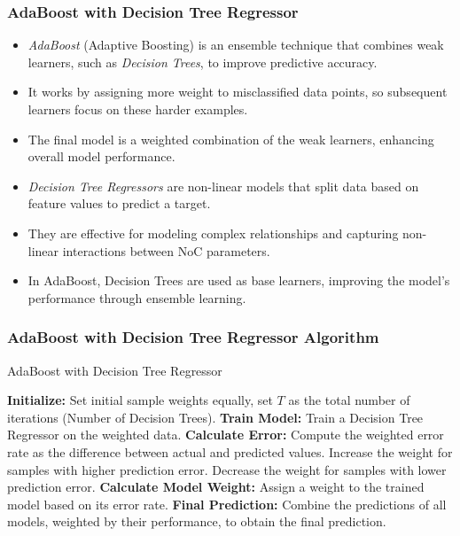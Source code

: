 \documentclass{beamer}
\begin{document}
\begin{frame}
\frametitle{AdaBoost with Decision Tree Regressor}

\begin{itemize}
    \item \textit{AdaBoost} (Adaptive Boosting) is an ensemble technique that combines weak learners, such as \textit{Decision Trees}, to improve predictive accuracy.
    \item It works by assigning more weight to misclassified data points, so subsequent learners focus on these harder examples.
    \item The final model is a weighted combination of the weak learners, enhancing overall model performance.
    \item \textit{Decision Tree Regressors} are non-linear models that split data based on feature values to predict a target.
    \item They are effective for modeling complex relationships and capturing non-linear interactions between NoC parameters.
    \item In AdaBoost, Decision Trees are used as base learners, improving the model's performance through ensemble learning.
\end{itemize}
\end{frame}

\begin{frame}
\frametitle{AdaBoost with Decision Tree Regressor Algorithm}

\begin{algorithm}[H]
\caption{AdaBoost with Decision Tree Regressor}
\begin{algorithmic}[1]
\State \textbf{Initialize:} Set initial sample weights equally, set $T$ as the total number of iterations (Number of Decision Trees).
    \State \textbf{Train Model:} Train a Decision Tree Regressor on the weighted data.
    \State \textbf{Calculate Error:} Compute the weighted error rate as the difference between actual and predicted values.
        \State Increase the weight for samples with higher prediction error.
        \State Decrease the weight for samples with lower prediction error.
    \EndFor
    \State \textbf{Calculate Model Weight:} Assign a weight to the trained model based on its error rate.
\EndFor
\State \textbf{Final Prediction:} Combine the predictions of all models, weighted by their performance, to obtain the final prediction.
\end{algorithmic}
\end{algorithm}

\end{frame}
\end{document}
